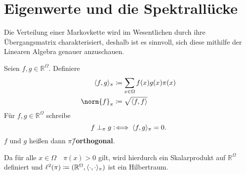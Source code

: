 \documentclass[ngerman,a4paper,11pt]{scrartcl}
\newcommand\coloniff{\vcentcolon\!\iff}
\newcommand{\RR}{\mathbb{R}}
\DeclarePairedDelimiter{\sprod}{\langle}{\rangle}	%
\begin{document}
\section{Eigenwerte und die Spektrallücke}
Die Verteilung einer Markovkette wird im Wesentlichen durch ihre Übergangsmatrix
charakterisiert, deshalb ist es sinnvoll, sich diese mithilfe der Linearen
Algebra genauer anzuschauen.

\begin{defn}
  Seien $f, g\in\RR^\Omega$. Definiere
  \begin{align*}
    \sprod{f,g}_\pi&\coloneqq\sum_{x\in\Omega}f(x)g(x)\pi(x) \\
    \norm{f}_\pi&\coloneqq\sqrt{\sprod{f,f}}
  \end{align*}
 Für $f,g\in\RR^\Omega$ schreibe 
 \begin{equation*}
  f\perp_\pi g\coloniff\sprod{f,g}_\pi=0.
 \end{equation*}
 $f$ und $g$ heißen dann \textbf{$\pi$\=/orthogonal}.
\end{defn}

\begin{rem}
 Da für alle $x\in\Omega\quad\pi(x)>0$ gilt, wird hierdurch ein Skalarprodukt auf
 $\RR^\Omega$ definiert und $\ell^2(\pi)\coloneqq(\RR^\Omega,
 \sprod{\cdot,\cdot}_\pi)$ ist ein Hilbertraum.
\end{rem}
\end{document}
